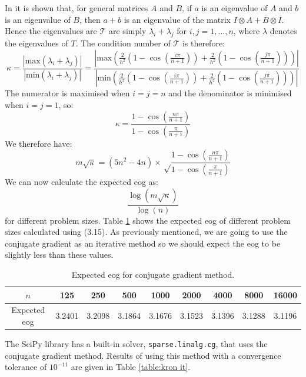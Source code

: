 \documentclass[11pt]{article}
\numberwithin{equation}{section}
\begin{document}
In \cite{Schacke} it is shown that, for general matrices $A$ and $B$, if $a$ is an eigenvalue of $A$ and $b$ is an eigenvalue of $B$, then $a + b$ is an eigenvalue of the matrix $I \otimes A + B \otimes I$. Hence the eigenvalues are $\mathcal{T}$ are simply $\lambda_i + \lambda_j$ for $i,j=1,\dots,n$, where $\lambda$ denotes the eigenvalues of $T$. The condition number of $\mathcal{T}$ is therefore:
\begin{equation}
\kappa = \frac{|\text{max} (\lambda_i + \lambda_j)|}{|\text{min}(\lambda_i + \lambda_j)|} 
= \frac{\left|\text{max} \left(\frac{2}{h^2} \left(1-\cos \left( \frac{i\pi}{n+1} \right) \right) 
+ \frac{2}{h^2} \left( 1-\cos \left( \frac{j\pi}{n+1} \right) \right) \right) \right|}
{\left|\text{min} \left( \frac{2}{h^2} \left( 1-\cos \left( \frac{i\pi}{n+1} \right) \right) 
+ \frac{2}{h^2} \left( 1-\cos \left( \frac{j\pi}{n+1} \right) \right) \right) \right|}
\end{equation}
The numerator is maximised when $i=j=n$ and the denominator is minimised when $i=j=1$, so:
\begin{equation}
\kappa = \frac{1-\cos \left(\frac{n \pi}{n+1} \right)}{1-\cos \left(\frac{\pi}{n+1} \right)}
\end{equation}
We therefore have:
\begin{equation}
m\sqrt{\kappa} = (5n^2-4n) \times \sqrt \frac{1-\cos \left(\frac{n \pi}{n+1} \right)}{1-\cos \left(\frac{\pi}{n+1} \right)}
\end{equation}
We can now calculate the expected eog as:
\begin{equation}
\frac{\log(m \sqrt \kappa)}{\log(n)}
\end{equation}
for different problem sizes. Table \ref{table:cg eog} shows the expected eog of different problem sizes calculated using (3.15). As previously mentioned, we are going to use the conjugate gradient as an iterative method so we should expect the eog to be slightly less than these values. 
\begin{table}[H]
\centering
\begin{tabular}{|c|c|c|c|c|c|c|c|c|}
\hline
$n$ & 125 & 250 & 500 & 1000 & 2000 & 4000 & 8000 & 16000 \\
\hline
Expected eog & 3.2401 & 3.2098 & 3.1864 & 3.1676 & 3.1523 & 3.1396 & 3.1288 & 3.1196 \\
\hline
\end{tabular}
\caption{Expected eog for conjugate gradient method.}
\label{table:cg eog}
\end{table}
The SciPy library has a built-in solver, \texttt{sparse.linalg.cg}, that uses the conjugate gradient method. Results of using this method with a convergence tolerance of $10^{-11}$ are given in Table \ref{table:kron it}. 
\end{document}
